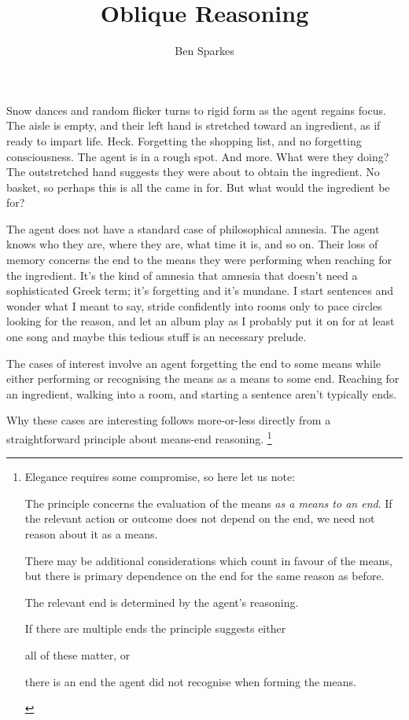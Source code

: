 \documentclass[10pt]{article}
\title{Oblique Reasoning}
\author{Ben Sparkes}
\begin{document}


\begin{scenario}
  Snow dances and random flicker turns to rigid form as the agent regains focus. The aisle is empty, and their left hand is stretched toward an ingredient, as if ready to impart life. Heck. Forgetting the shopping list, and no forgetting consciousness. The agent is in a rough spot. And more. What were they doing? The outstretched hand suggests they were about to obtain the ingredient. No basket, so perhaps this is all the came in for. But what would the ingredient be for?
\end{scenario}


The agent does not have a standard case of philosophical amnesia.
The agent knows who they are, where they are, what time it is, and so on.
Their loss of memory concerns the end to the means they were performing when reaching for the ingredient.
It's the kind of amnesia that amnesia that doesn't need a sophisticated Greek term; it's forgetting and it's mundane.
I start sentences and wonder what I meant to say, stride confidently into rooms only to pace circles looking for the reason, and let an album play as I probably put it on for at least one song and maybe this tedious stuff is an necessary prelude.

The cases of interest involve an agent forgetting the end to some means while either performing or recognising the means as a means to some end.
Reaching for an ingredient, walking into a room, and starting a sentence aren't typically ends.

Why these cases are interesting follows more-or-less directly from a straightforward principle about means-end reasoning.\nolinebreak
\footnote{Elegance requires some compromise, so here let us note:
  \begin{enumerate*}[label=\alph*)]
  \item The principle concerns the evaluation of the means \emph{as a means to an end}.
    If the relevant action or outcome does not depend on the end, we need not reason about it as a means.
  \item There may be additional considerations which count in favour of the means, but there is primary dependence on the end for the same reason as before.
  \item The relevant end is determined by the agent's reasoning.
  \item If there are multiple ends the principle suggests either
    \begin{enumerate*}[label=\roman*)]
    \item all of these matter, or
    \item there is an end the agent did not recognise when forming the means.
    \end{enumerate*}
  \end{enumerate*}
}
\end{document}
